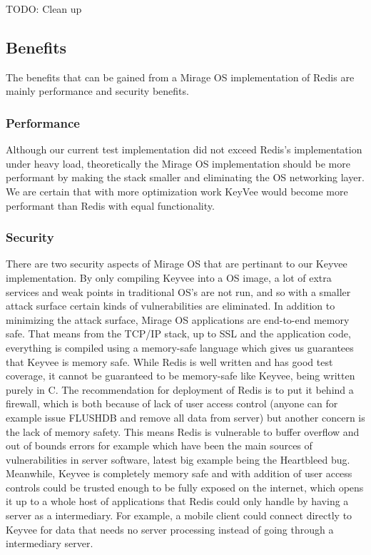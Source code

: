 \documentclass[english,10pt,twocolumn]{article}
\begin{document}
TODO: Clean up

\subsection{Benefits}

The benefits that can be gained from a Mirage OS implementation of Redis are mainly performance and security benefits.

\subsubsection{Performance}

Although our current test implementation did not exceed Redis's implementation under heavy load, theoretically the Mirage OS implementation should be more performant by making the stack smaller and eliminating the OS networking layer. We are certain that with more optimization work KeyVee would become more performant than Redis with equal functionality.

\subsubsection{Security}

There are two security aspects of Mirage OS that are pertinant to our Keyvee implementation.
By only compiling Keyvee into a OS image, a lot of extra services and weak points in traditional OS's are not run, and so with a smaller attack surface certain kinds of vulnerabilities are eliminated.
In addition to minimizing the attack surface, Mirage OS applications are end-to-end memory safe.
That means from the TCP/IP stack, up to SSL and the application code, everything is compiled using a memory-safe language which gives us guarantees that Keyvee is memory safe.
While Redis is well written and has good test coverage, it cannot be guaranteed to be memory-safe like Keyvee, being written purely in C.
The recommendation for deployment of Redis is to put it behind a firewall, which is both because of lack of user access control (anyone can for example issue FLUSHDB and remove all data from server) but another concern is the lack of memory safety.
This means Redis is vulnerable to buffer overflow and out of bounds errors for example which have been the main sources of vulnerabilities in server software, latest big example being the Heartbleed bug.
Meanwhile, Keyvee is completely memory safe and with addition of user access controls could be trusted enough to be fully exposed on the internet, which opens it up to a whole host of applications that Redis could only handle by having a server as a intermediary.
For example, a mobile client could connect directly to Keyvee for data that needs no server processing instead of going through a intermediary server.
\end{document}
